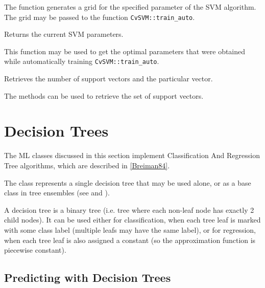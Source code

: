 The function generates a grid for the specified parameter of the SVM algorithm. The grid may be passed to the function \texttt{CvSVM::train\_auto}.


Returns the current SVM parameters.


This function may be used to get the optimal parameters that were obtained while automatically training \texttt{CvSVM::train\_auto}.


Retrieves the number of support vectors and the particular vector.


The methods can be used to retrieve the set of support vectors.

\section{Decision Trees}


The ML classes discussed in this section implement Classification And Regression Tree algorithms, which are described in \href{#paper_Breiman84}{[Breiman84]}.

The class  represents a single decision tree that may be used alone, or as a base class in tree ensembles (see  and ).

A decision tree is a binary tree (i.e. tree where each non-leaf node has exactly 2 child nodes). It can be used either for classification, when each tree leaf is marked with some class label (multiple leafs may have the same label), or for regression, when each tree leaf is also assigned a constant (so the approximation function is piecewise constant).

\subsection{Predicting with Decision Trees}

